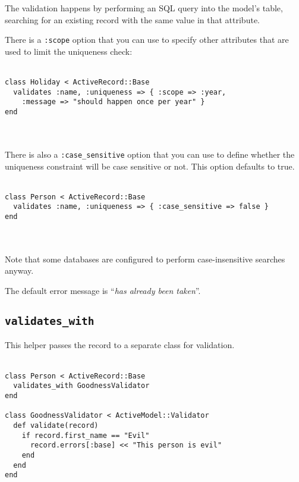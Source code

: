 \documentclass[10pt]{book}
\begin{document}
The validation happens by performing an SQL query into the model’s table, searching for an existing record with the same value in that attribute.

There is a \texttt{:scope} option that you can use to specify other attributes that are used to limit the uniqueness check:
\\ \\
\begin{minipage}{\textwidth}{\scriptsize
\begin{verbatim}
class Holiday < ActiveRecord::Base
  validates :name, :uniqueness => { :scope => :year,
    :message => "should happen once per year" }
end
\end{verbatim}}
\end{minipage}
\\ \\

There is also a \texttt{:case\_sensitive} option that you can use to  define whether the uniqueness constraint will be case sensitive or not.  This option defaults to true.
\\ \\
\begin{minipage}{\textwidth}{\scriptsize
\begin{verbatim}
class Person < ActiveRecord::Base
  validates :name, :uniqueness => { :case_sensitive => false }
end
\end{verbatim}}
\end{minipage}
\\ \\

Note that some databases are configured to perform case-insensitive searches anyway.

The default error message is “\emph{has already been taken}”.

\subsection{ \texttt{validates\_with}}

This helper passes the record to a separate class for validation.
\\ \\
\begin{minipage}{\textwidth}{\scriptsize
\begin{verbatim}
class Person < ActiveRecord::Base
  validates_with GoodnessValidator
end
 
class GoodnessValidator < ActiveModel::Validator
  def validate(record)
    if record.first_name == "Evil"
      record.errors[:base] << "This person is evil"
    end
  end
end
\end{verbatim}}
\end{minipage}
\\ \\
\end{document}
